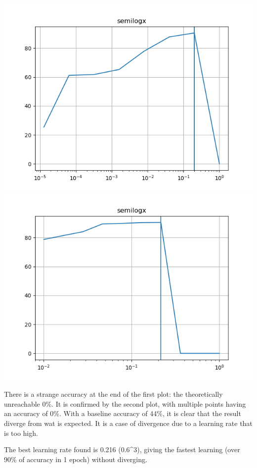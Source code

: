 \includegraphics{parts/appendix/reports-papud/2018_07_23-Learning_rate_optimisation/lr_epoch_1_mul_0_2.png}
\includegraphics{parts/appendix/reports-papud/2018_07_23-Learning_rate_optimisation/lr_epoch_1_mul_0_6_best_0_216.png}

There is a strange accuracy at the end of the first plot: the
theoretically unreachable 0\%. It is confirmed by the second plot, with
multiple points having an accuracy of 0\%. With a baseline accuracy of
44\%, it is clear that the result diverge from wat is expected. It is a
case of divergence due to a learning rate that is too high.

The best learning rate found is 0.216 (0.6\^{}3), giving the fastest
learning (over 90\% of accuracy in 1 epoch) without diverging.

